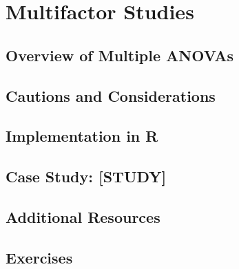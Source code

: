 
\chapter{Multifactor Studies}

\section{Overview of Multiple ANOVAs}

\section{Cautions and Considerations}

\section{Implementation in R}

\section{Case Study: [STUDY]}

\section{Additional Resources}

\section{Exercises}